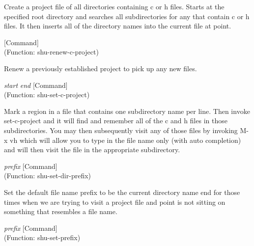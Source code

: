 \begin{doc-string}
Create a project file of all directories containing c or h files.
Starts at the specified root directory and searches all subdirectories for
any that contain c or h files.  It then inserts all of the directory names
into the current file at point.
\end{doc-string}

\vspace{1em}
\noindent
{}
\usebox{\funcname}
 \hfill [Command]\\%
 (Function: shu-renew-c-project)

\begin{doc-string}
Renew a previously established project to pick up any new files.
\end{doc-string}

\vspace{1em}
\noindent
{}
\usebox{\funcname}\emph{start} \emph{end}
 \hfill [Command]\\%
 (Function: shu-set-c-project)

\begin{doc-string}
Mark a region in a file that contains one subdirectory name per line.
Then invoke set-c-project and it will find and remember all of the c and h
files in those subdirectories.  You may then subsequently visit any of
those files by invoking M-x vh which will allow you to type in the file
name only (with auto completion) and will then visit the file in the
appropriate subdirectory.
\end{doc-string}

\vspace{1em}
\noindent
{}
\usebox{\funcname}\emph{prefix}
 \hfill [Command]\\%
 (Function: shu-set-dir-prefix)

\begin{doc-string}
Set the default file name prefix to be the current directory name end for those
times when we are trying to visit a project file and point is not sitting on
something that resembles a file name.
\end{doc-string}

\vspace{1em}
\noindent
{}
\usebox{\funcname}\emph{prefix}
 \hfill [Command]\\%
 (Function: shu-set-prefix)

